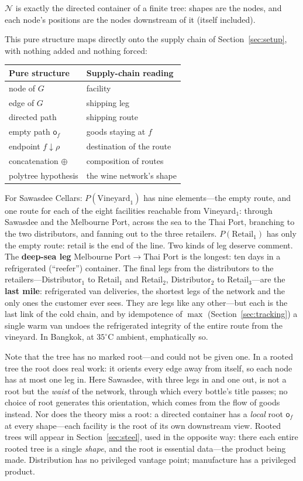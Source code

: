 \documentclass[11pt,a4paper]{article}
\newcommand{\N}{\mathcal{N}}
\newcommand{\dc}{\mathbin{\downarrow}}
\newcommand{\obs}{\mathsf{o}}
\theoremstyle{plain}
\theoremstyle{definition}
\theoremstyle{remark}
\begin{document}
$\N$ is exactly the directed container of a finite tree: shapes
are the nodes, and each node's positions are the nodes downstream
of it (itself included).

This pure structure maps directly onto the supply chain of
Section~\ref{sec:setup}, with nothing added and nothing forced:

\begin{center}
\begin{tabular}{ll}
\toprule
Pure structure & Supply-chain reading \\
\midrule
node of $G$ & facility \\
edge of $G$ & shipping leg \\
directed path & shipping route \\
empty path $\obs_f$ & goods staying at $f$ \\
endpoint $f \dc \rho$ & destination of the route \\
concatenation $\oplus$ & composition of routes \\
polytree hypothesis & the wine network's shape \\
\bottomrule
\end{tabular}
\end{center}

For Sawasdee Cellars: $P(\text{Vineyard}_1)$ has nine elements---the
empty route, and one route for each of the eight facilities reachable
from Vineyard$_1$: through Sawasdee and the Melbourne Port,
across the sea to the Thai Port, branching to the two distributors,
and fanning out to
the three retailers. $P(\text{Retail}_1)$ has only the empty route:
retail is the end of the line. Two kinds of leg deserve comment. The
\textbf{deep-sea leg} Melbourne Port${}\to{}$Thai Port is the longest:
ten days in a refrigerated (``reefer'') container. The final legs
from the distributors to the retailers---Distributor$_1$ to Retail$_1$
and Retail$_2$, Distributor$_2$ to Retail$_3$---are the \textbf{last mile}:
refrigerated van deliveries, the shortest legs of the network and the
only ones the customer ever sees. They are legs like any other---but
each is the last link of the cold chain, and by idempotence of $\max$
(Section~\ref{sec:tracking}) a single warm van undoes the
refrigerated integrity of the entire route from the vineyard. In
Bangkok, at $35^{\circ}$C ambient, emphatically so.

Note that the tree has no marked root---and could not be given
one. In a rooted tree the root does real work: it orients every
edge away from itself, so each node has at most one leg in. Here
Sawasdee, with three legs in and one out, is not a root but the
\emph{waist} of the network, through which every bottle's title
passes; no choice of root generates this orientation, which comes
from the flow of goods instead. Nor does the theory miss a root: a
directed container has a \emph{local} root $\obs_f$ at every
shape---each facility is the root of its own downstream view.
Rooted trees will appear in Section~\ref{sec:steel}, used in the
opposite way: there each entire rooted tree is a single
\emph{shape}, and the root is essential data---the product being
made. Distribution has no privileged vantage point; manufacture
has a privileged product.
\end{document}
